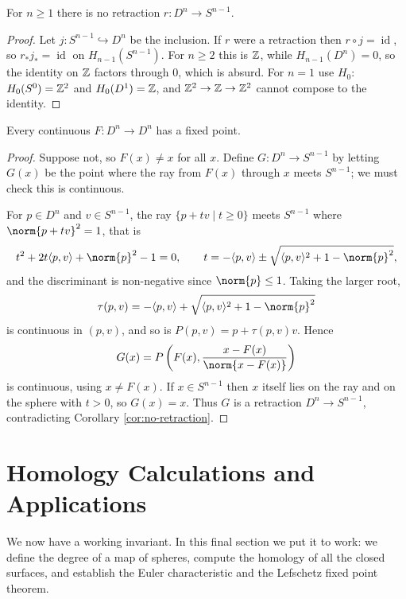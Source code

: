 \documentclass[a4paper]{scrartcl}
\newcommand{\id}{\operatorname{id}}
\begin{document}
\begin{corollary} \label{cor:no-retraction}
	For $n \geq 1$ there is no retraction $r: D^n \to S^{n-1}$.
\end{corollary}
\begin{proof}
	Let $j: S^{n-1}\hookrightarrow D^n$ be the inclusion. If $r$ were a retraction then $r\circ j = \id$, so $r_*j_* = \id$ on $H_{n-1}(S^{n-1})$. For $n \geq 2$ this is $\mathbb{Z}$, while $H_{n-1}(D^n) = 0$, so the identity on $\mathbb{Z}$ factors through $0$, which is absurd. For $n = 1$ use $H_0$: $H_0(S^0) = \mathbb{Z}^2$ and $H_0(D^1) = \mathbb{Z}$, and $\mathbb{Z}^2 \to \mathbb{Z} \to \mathbb{Z}^2$ cannot compose to the identity.
\end{proof}

\begin{theorem} \label{at-thm:brouwer}
	Every continuous $F: D^n \to D^n$ has a fixed point.
\end{theorem}
\begin{proof}
	Suppose not, so $F(x)\neq x$ for all $x$. Define $G: D^n \to S^{n-1}$ by letting $G(x)$ be the point where the ray from $F(x)$ through $x$ meets $S^{n-1}$; we must check this is continuous.

	For $p \in D^n$ and $v\in S^{n-1}$, the ray $\{p+tv \mid t \geq 0\}$ meets $S^{n-1}$ where $\norm{p+tv}^2 = 1$, that is
	$$
	t^2 + 2t\langle p,v\rangle + \norm{p}^2 - 1 = 0, \qquad t = -\langle p,v\rangle \pm \sqrt{\langle p,v\rangle^2+1-\norm{p}^2},
	$$
	and the discriminant is non-negative since $\norm{p}\leq 1$. Taking the larger root,
	$$
	\tau(p,v) = -\langle p,v\rangle + \sqrt{\langle p,v\rangle^2+1-\norm{p}^2}
	$$
	is continuous in $(p,v)$, and so is $P(p,v) = p + \tau(p,v)v$. Hence
	$$
	G(x) = P\left(F(x), \frac{x-F(x)}{\norm{x-F(x)}}\right)
	$$
	is continuous, using $x \neq F(x)$. If $x \in S^{n-1}$ then $x$ itself lies on the ray and on the sphere with $t > 0$, so $G(x) = x$. Thus $G$ is a retraction $D^n \to S^{n-1}$, contradicting Corollary \ref{cor:no-retraction}.
\end{proof}

\section{Homology Calculations and Applications}

We now have a working invariant. In this final section we put it to work: we define the
degree of a map of spheres, compute the homology of all the closed surfaces, and
establish the Euler characteristic and the Lefschetz fixed point theorem.
\end{document}
